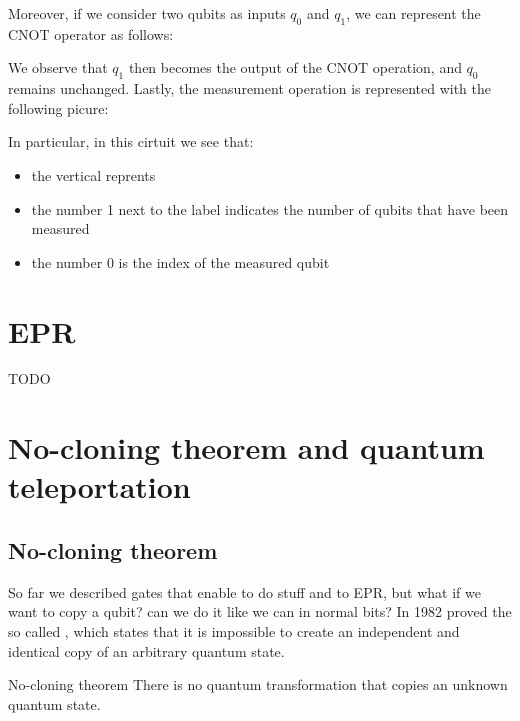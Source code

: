 \documentclass[a4paper, 12pt]{report}
\begin{document}

Moreover, if we consider two qubits as inputs $q_0$ and $q_1$, we can represent the CNOT operator as follows:


We observe that $q_1$ then becomes the output of the CNOT operation, and $q_0$ remains unchanged. Lastly, the measurement operation is represented with the following picure:


In particular, in this cirtuit we see that:

\begin{itemize}
	\item the vertical  reprents 
	\item the number 1 next to the label  indicates the number of qubits that have been measured
	\item the number 0 is the index of the measured qubit
\end{itemize}


\section{EPR}

TODO 

\section{No-cloning theorem and quantum teleportation}

\subsection{No-cloning theorem}

So far we described gates that enable to do stuff and to EPR, but what if we want to copy a qubit? can we do it like we can in normal bits?  In 1982 \textcite{nocloning} proved the so called , which states that it is impossible to create an independent and identical copy of an arbitrary  quantum state.

\begin{framedthm}{No-cloning theorem}
	There is no quantum transformation that copies an unknown quantum state.
\end{framedthm}
\end{document}
